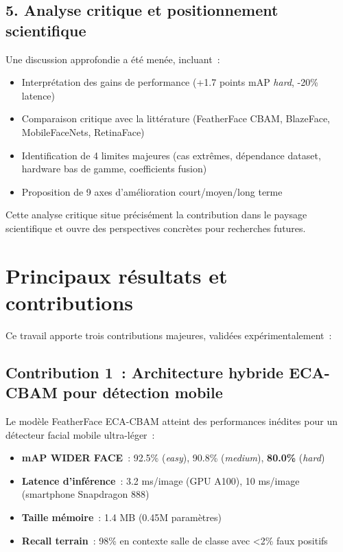 \begin{onehalfspace}
\subsection*{5. Analyse critique et positionnement scientifique}

\hspace{0.65 cm}Une discussion approfondie a été menée, incluant~:
\begin{itemize}
\item Interprétation des gains de performance (+1.7 points mAP \textit{hard}, -20\% latence)
\item Comparaison critique avec la littérature (FeatherFace CBAM, BlazeFace, MobileFaceNets, RetinaFace)
\item Identification de 4 limites majeures (cas extrêmes, dépendance dataset, hardware bas de gamme, coefficients fusion)
\item Proposition de 9 axes d'amélioration court/moyen/long terme
\end{itemize}

\hspace{0.65 cm}Cette analyse critique situe précisément la contribution dans le paysage scientifique et ouvre des perspectives concrètes pour recherches futures.

\section*{Principaux résultats et contributions}

\hspace{0.65 cm}Ce travail apporte trois contributions majeures, validées expérimentalement~:

\subsection*{Contribution 1~: Architecture hybride ECA-CBAM pour détection mobile}

\hspace{0.65 cm}Le modèle FeatherFace ECA-CBAM atteint des performances inédites pour un détecteur facial mobile ultra-léger~:

\begin{itemize}
\item \textbf{mAP WIDER FACE}~: 92.5\% (\textit{easy}), 90.8\% (\textit{medium}), \textbf{80.0\%} (\textit{hard})
\item \textbf{Latence d'inférence}~: 3.2 ms/image (GPU A100), 10 ms/image (smartphone Snapdragon 888)
\item \textbf{Taille mémoire}~: 1.4 MB (0.45M paramètres)
\item \textbf{Recall terrain}~: 98\% en contexte salle de classe avec <2\% faux positifs
\end{itemize}


\end{onehalfspace}
